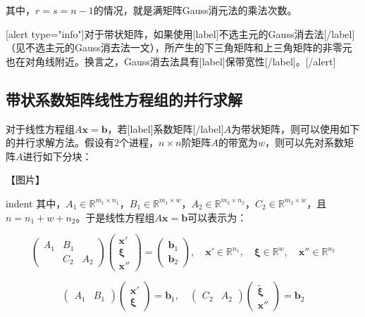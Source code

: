 \documentclass[UTF8,nofonts]{ctexart}
\begin{document}
其中，$r=s=n-1$的情况，就是满矩阵Gauss消元法的乘法次数。


[alert type="info"]对于带状矩阵，如果使用[label]不选主元的Gauss消去法[/label]（见不选主元的Gauss消去法一文），所产生的下三角矩阵和上三角矩阵的非零元也在对角线附近。换言之，Gauss消去法具有[label]保带宽性[/label]。[/alert]

\subsection*{带状系数矩阵线性方程组的并行求解}

对于线性方程组$A\boldsymbol{x}=\boldsymbol{b}$，若[label]系数矩阵[/label]$A$为带状矩阵，则可以使用如下的并行求解方法。假设有$2$个进程，$n \times n$阶矩阵$A$的带宽为$w$，则可以先对系数矩阵$A$进行如下分块：

【图片】

indent 其中，$A_1\in\mathbb{R}^{m_1\times n_1}$，$B_1\in\mathbb{R}^{m_1\times w}$，$A_2\in\mathbb{R}^{m_2\times n_2}$，$C_2\in\mathbb{R}^{m_2\times w}$，且$n=n_1+w+n_2$。于是线性方程组$A\boldsymbol{x}=\boldsymbol{b}$可以表示为：

\begin{equation}
\label{eq:b12}
\begin{pmatrix}
A_1 & B_1 & \\
& C_2 & A_2
\end{pmatrix}
\begin{pmatrix}
\boldsymbol{x}' \\
\boldsymbol{\xi} \\
\boldsymbol{x}''
\end{pmatrix}=
\begin{pmatrix}
\boldsymbol{b}_1 \\
\boldsymbol{b}_2
\end{pmatrix},\quad
\boldsymbol{x}'\in\mathbb{R}^{n_1},\quad\boldsymbol{\xi}\in\mathbb{R}^{w},\quad\boldsymbol{x}''\in\mathbb{R}^{n_2}
\end{equation}

\begin{equation}
\label{eq:b1b2}
\begin{pmatrix}
A_1 & B_1
\end{pmatrix}
\begin{pmatrix}
\boldsymbol{x}' \\
\boldsymbol{\xi}
\end{pmatrix}=\boldsymbol{b}_1,\quad
\begin{pmatrix}
C_2 & A_2
\end{pmatrix}
\begin{pmatrix}
\boldsymbol{\tilde{\xi}} \\
\boldsymbol{x}''
\end{pmatrix}=\boldsymbol{b}_2
\end{equation}
\end{document}
